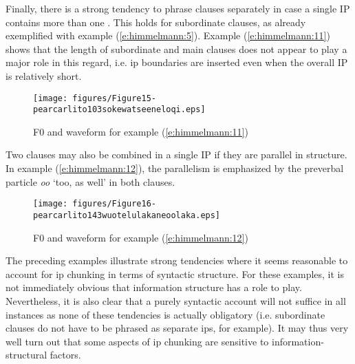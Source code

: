 \documentclass[output=paper
,modfonts
,nonflat]{langsci/langscibook}
\begin{document}
\noindent
Finally, there is a strong tendency to phrase clauses separately in case a single IP contains more than one . This holds for subordinate clauses, as already exemplified with example (\ref{e:himmelmann:5}). Example (\ref{e:himmelmann:11}) shows that the length of subordinate and main clauses does not appear to play a major role in this regard, i.e. ip boundaries are inserted even when the overall IP is relatively short.


\begin{figure}
	\texttt{[image: figures/Figure15-pearcarlito103sokewatseeneloqi.eps]}
	\caption{F0 and waveform for example (\ref{e:himmelmann:11})}
	\label{f15}
\end{figure}

\noindent\largerpage
Two clauses may also be combined in a single IP if they are parallel in structure. In example (\ref{e:himmelmann:12}), the parallelism is emphasized by the preverbal particle \textit{oo} ‘too, as well’ in both clauses.


\begin{figure}
	\texttt{[image: figures/Figure16-pearcarlito143wuotelulakaneoolaka.eps]}
	\caption{F0 and waveform for example (\ref{e:himmelmann:12})}
	\label{f16}
\end{figure}

\noindent
The preceding examples illustrate strong tendencies where it seems reasonable to account for ip chunking in terms of syntactic structure. For these examples, it is not immediately obvious that information structure has a role to play. Nevertheless, it is also clear that a purely syntactic account will not suffice in all instances as none of these tendencies is actually obligatory (i.e. subordinate clauses do not have to be phrased as separate ips, for example). It may thus very well turn out that some aspects of ip chunking are sensitive to information-structural factors.
\end{document}
